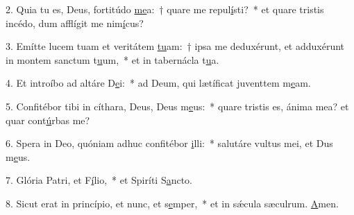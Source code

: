 2. Quia tu es, Deus, fortitúdo \uline{me}a:~† quare me repul\uline{í}sti?~* et quare tristis incédo, dum afflígit me nim\uline{í}cus?\par 
3. Emítte lucem tuam et veritátem \uline{tu}am:~† ipsa me deduxérunt, et adduxérunt in montem sanctum t\uline{u}um,~* et in tabernácla t\uline{u}a.\par 
4. Et introíbo ad altáre D\uline{e}i:~* ad Deum, qui lætíficat juventtem m\uline{e}am.\par 
5. Confitébor tibi in cíthara, Deus, Deus m\uline{e}us:~* quare tristis es, ánima mea? et quar cont\uline{ú}rbas me?\par 
6. Spera in Deo, quóniam adhuc confitébor \uline{i}lli:~* salutáre vultus mei, et Dus m\uline{e}us.\par 
7. Glória Patri, et F\uline{í}lio,~* et Spiríti S\uline{a}ncto.\par 
8. Sicut erat in princípio, et nunc, et s\uline{e}mper,~* et in sǽcula sæculrum. \uline{A}men.\par 
